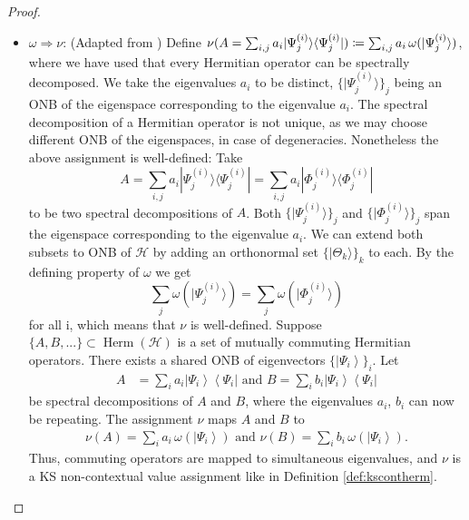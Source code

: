 \begin{proof}
\begin{itemize}
\item $\omega\Rightarrow\nu$: (Adapted from \cite{Pusey2019}) Define $\nu(A=\sum_{i,j}a_{i}|\Psi_{j}^{(i)}\rangle\langle\Psi_{j}^{(i)}|)\coloneqq\sum_{i,j}a_{i}\thinspace\omega(|\Psi_{j}^{(i)}\rangle)$, where we have used that every Hermitian operator can be spectrally decomposed. We take the eigenvalues $a_{i}$ to be distinct, $\{|\Psi_{j}^{(i)}\rangle\}_{j}$ being an ONB of the eigenspace corresponding to the eigenvalue $a_{i}$. The spectral decomposition of a Hermitian operator is not unique, as we may choose different ONB of the eigenspaces, in case of degeneracies. Nonetheless the above assignment is well-defined: Take
\begin{equation*}
    A=\sum_{i,j}a_{i}|\Psi_{j}^{(i)}\rangle\langle\Psi_{j}^{(i)}|=\sum_{i,j}a_{i}|\Phi_{j}^{(i)}\rangle\langle\Phi_{j}^{(i)}|
\end{equation*}
to be two spectral decompositions of $A$. Both $\{|\Psi_{j}^{(i)}\rangle\}_{j}$ and $\{|\Phi_{j}^{(i)}\rangle\}_{j}$ span the eigenspace corresponding to the eigenvalue $a_{i}$. We can extend both subsets to ONB of $\mathcal{H}$ by adding an orthonormal set $\{|\Theta_{k}\rangle\}_{k}$ to each. By the defining property of $\omega$ we get
\begin{equation*}
    \sum_{j}\omega(|\Psi_{j}^{(i)}\rangle)=\sum_{j}\omega(|\Phi_{j}^{(i)}\rangle)
\end{equation*} 
for all i, which means that $\nu$ is well-defined. Suppose $\{A,B,...\}\subset\operatorname{Herm}(\mathcal{H})$ is a set of mutually commuting Hermitian operators. There exists a shared ONB of eigenvectors $\{\left|\Psi_{i}\right\rangle \}_{i}$. Let 
\begin{align*}
    A & =\sum_{i}a_{i}\left|\Psi_{i}\right\rangle \left\langle \Psi_{i}\right| \text{ and } B =\sum_{i}b_{i}\left|\Psi_{i}\right\rangle \left\langle \Psi_{i}\right|
\end{align*}
be spectral decompositions of $A$ and $B$, where the eigenvalues $a_{i}$, $b_{i}$ can now be repeating. The assignment $\nu$ maps $A$ and $B$ to
\begin{align*}
    \nu(A) =\sum_{i}a_{i}\,\omega(\left|\Psi_{i}\right\rangle ) \text{ and } \nu(B)  =\sum_{i}b_{i}\,\omega(\left|\Psi_{i}\right\rangle ).
\end{align*}
Thus, commuting operators are mapped to simultaneous eigenvalues, and $\nu$ is a KS non-contextual value assignment like in Definition \ref{def:kscontherm}.
\end{itemize}
\end{proof}

